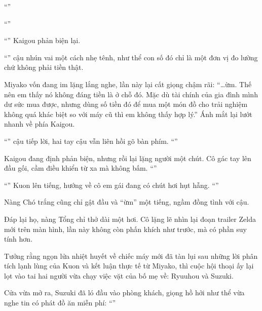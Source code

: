 \documentclass[../main.tex]{subfiles}
\begin{document}
``''

``''

``'' Kaigou phản biện lại.

``'' cậu nhún vai một cách nhẹ tênh, như thể con số đó chỉ là một đơn vị đo lường chứ không phải tiền thật.

Miyako vốn đang im lặng lắng nghe, lần này lại cất giọng chậm rãi: ``\dots ừm. Thế nên em thấy nó không đáng tiền là ở chỗ đó. Mặc dù tài chính của gia đình mình dư sức mua được, nhưng dùng số tiền đó để mua một món đồ cho trải nghiệm không quá khác biệt so với máy cũ thì em không thấy hợp lý.'' Ánh mắt lại lướt nhanh về phía Kaigou.

``'' cậu tiếp lời, hai tay cậu vẫn liên hồi gõ bàn phím. ``''

Kaigou đang định phản biện, nhưng rồi lại lặng người một chút. Cô gác tay lên đầu gối, cầm điều khiển từ xa mà không bấm. ``''

``'' Kuon lên tiếng, hướng về cô em gái đang có chút hơi hụt hẫng. ``''

Nàng Chó trắng cũng chỉ gật đầu và ``ừm'' một tiếng, ngầm đồng tình với cậu.

Đáp lại họ, nàng Tổng chỉ thở dài một hơi. Cô lặng lẽ nhìn lại đoạn trailer Zelda mới trên màn hình, lần này không còn phấn khích như trước, mà có phần suy tính hơn.

Tưởng rằng ngọn lửa nhiệt huyết về chiếc máy mới đã tàn lụi sau những lời phân tích lạnh lùng của Kuon và kết luận thực tế từ Miyako, thì cuộc hội thoại ấy lại lọt vào tai hai người vừa chạy việc vặt của bố mẹ về: Ryuuhou và Suzuki.

Cửa vừa mở ra, Suzuki đã ló đầu vào phòng khách, giọng hồ hởi như thể vừa nghe tin có phát đồ ăn miễn phí: ``''
\end{document}
